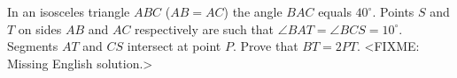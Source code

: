 \problem
In an isosceles triangle $ABC$ ($AB = AC$) the angle $BAC$ equals $40^\circ$.
Points $S$ and $T$ on sides $AB$ and $AC$ respectively are such that
$\angle BAT = \angle BCS = 10^\circ$.
Segments $AT$ and $CS$ intersect at point $P$.
Prove that $BT = 2 PT$. 
\solution
<FIXME: Missing English solution.>
\endproblem
